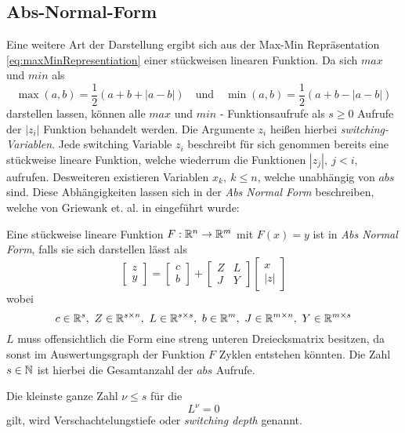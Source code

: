 \subsection{Abs-Normal-Form}
\label{sec:absNormalForm}
Eine weitere Art der Darstellung ergibt sich aus der Max-Min Repräsentation \eqref{eq:maxMinRepresentiation} einer stückweisen linearen Funktion.
Da sich $max$ und $min$ als
\[
\max(a,b) = \frac{1}{2}(a+b + |a-b|)\quad \text{und} \quad \min(a,b) = \frac{1}{2}(a+b - |a-b|)
\]
darstellen lassen, können alle $max$ und $min$ - Funktionsaufrufe als $s\geq 0$ Aufrufe der $|z_i|$ Funktion behandelt werden. Die Argumente $z_i$ heißen hierbei \textit{switching-Variablen}. Jede switching Variable $z_i$ beschreibt für sich genommen bereits eine stückweise lineare Funktion, welche wiederrum die Funktionen $|z_j|, ~j<i$, aufrufen. Desweiteren existieren Variablen $x_k, ~k\leq n$, welche unabhängig von $abs$ sind. Diese Abhängigkeiten lassen sich in der \textit{Abs Normal Form} beschreiben, welche von Griewank et. al. in \cite{plan} eingeführt wurde:
\begin{definition}
 Eine stückweise lineare Funktion $F:\mathbb{R}^n\to \mathbb{R}^m$ mit $F(x) = y$ ist in \textit{Abs Normal Form}, falls sie sich darstellen lässt als
 \begin{equation}
\label{eq:absNormalForm}
  \begin{bmatrix}
   z\\y
  \end{bmatrix}
  =
  \begin{bmatrix}
   c\\b
  \end{bmatrix}
  +
  \begin{bmatrix}
   Z & L\\
   J & Y
  \end{bmatrix}
  \begin{bmatrix}
   x\\|z|
  \end{bmatrix}
 \end{equation}
wobei 
\[
c\in \mathbb{R}^s, ~ Z\in \mathbb{R}^{s\times n},~ L\in\mathbb{R}^{s\times s}, ~ b\in\mathbb{R}^m, ~ J\in\mathbb{R}^{m\times n}, ~ Y\in \mathbb{R}^{m\times s} 
\]
$L$ muss offensichtlich die Form eine streng unteren Dreiecksmatrix besitzen, da sonst im Auswertungsgraph der Funktion $F$ Zyklen entstehen könnten. Die Zahl $s\in \mathbb{N}$ ist hierbei die Gesamtanzahl der $abs$ Aufrufe.
\end{definition}
Die kleinste ganze Zahl $\nu \leq s$ für die 
\[
 L^\nu =0
\]
gilt, wird Verschachtelungstiefe oder \textit{switching depth} genannt. 
